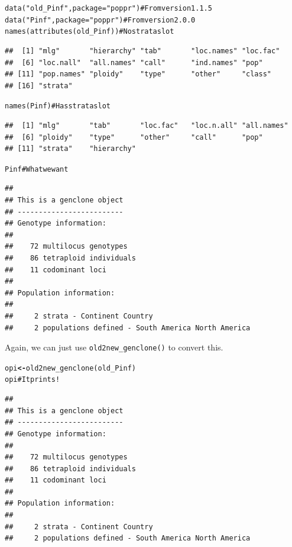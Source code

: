\documentclass[letterpaper]{article}\usepackage[]{graphicx}\usepackage[]{color}
\makeatletter
\newcommand{\hlstr}[1]{\textcolor[rgb]{0.651,0.522,0}{#1}}%
\newcommand{\hlcom}[1]{\textcolor[rgb]{1,0.502,0}{#1}}%
\newcommand{\hlstd}[1]{\textcolor[rgb]{0,0,0}{#1}}%
\newcommand{\hlkwb}[1]{\textcolor[rgb]{0.502,0.502,0.753}{\textbf{#1}}}%
\newcommand{\hlkwc}[1]{\textcolor[rgb]{0,0.502,0.753}{#1}}%
\newcommand{\hlkwd}[1]{\textcolor[rgb]{0,0.267,0.4}{#1}}%
\newenvironment{kframe}{%
 \def\at@end@of@kframe{}%
 \ifinner\ifhmode%
  \def\at@end@of@kframe{\end{minipage}}%
  \begin{minipage}{\columnwidth}%
 \fi\fi%
 \def\FrameCommand##1{\hskip\@totalleftmargin \hskip-\fboxsep
 \colorbox{shadecolor}{##1}\hskip-\fboxsep
     \hskip-\linewidth \hskip-\@totalleftmargin \hskip\columnwidth}%
 \MakeFramed {\advance\hsize-\width
   \@totalleftmargin\z@ \linewidth\hsize
   \@setminipage}}%
 {\par\unskip\endMakeFramed%
 \at@end@of@kframe}
\newenvironment{knitrout}{}{} %
\makeatother
\begin{document}
\begin{knitrout}
\color{fgcolor}\begin{kframe}
\begin{alltt}
\hlkwd{data}\hlstd{(}\hlstr{"old_Pinf"}\hlstd{,} \hlkwc{package} \hlstd{=} \hlstr{"poppr"}\hlstd{)} \hlcom{# From version 1.1.5}
\hlkwd{data}\hlstd{(}\hlstr{"Pinf"}\hlstd{,} \hlkwc{package} \hlstd{=} \hlstr{"poppr"}\hlstd{)}     \hlcom{# From version 2.0.0}
\hlkwd{names}\hlstd{(}\hlkwd{attributes}\hlstd{(old_Pinf))}         \hlcom{# No strata slot}
\end{alltt}
\begin{verbatim}
##  [1] "mlg"       "hierarchy" "tab"       "loc.names" "loc.fac"  
##  [6] "loc.nall"  "all.names" "call"      "ind.names" "pop"      
## [11] "pop.names" "ploidy"    "type"      "other"     "class"    
## [16] "strata"
\end{verbatim}
\begin{alltt}
\hlkwd{names}\hlstd{(Pinf)}                         \hlcom{# Has strata slot}
\end{alltt}
\begin{verbatim}
##  [1] "mlg"       "tab"       "loc.fac"   "loc.n.all" "all.names"
##  [6] "ploidy"    "type"      "other"     "call"      "pop"      
## [11] "strata"    "hierarchy"
\end{verbatim}
\begin{alltt}
\hlstd{Pinf}                                \hlcom{# What we want}
\end{alltt}
\begin{verbatim}
## 
## This is a genclone object
## -------------------------
## Genotype information:
## 
##    72 multilocus genotypes
##    86 tetraploid individuals
##    11 codominant loci
## 
## Population information:
## 
##     2 strata - Continent Country
##     2 populations defined - South America North America
\end{verbatim}
\end{kframe}
\end{knitrout}

Again, we can just use \texttt{old2new\_genclone()} to convert this. 

\begin{knitrout}
\color{fgcolor}\begin{kframe}
\begin{alltt}
\hlstd{opi} \hlkwb{<-} \hlkwd{old2new_genclone}\hlstd{(old_Pinf)}
\hlstd{opi} \hlcom{# It prints!}
\end{alltt}
\begin{verbatim}
## 
## This is a genclone object
## -------------------------
## Genotype information:
## 
##    72 multilocus genotypes
##    86 tetraploid individuals
##    11 codominant loci
## 
## Population information:
## 
##     2 strata - Continent Country
##     2 populations defined - South America North America
\end{verbatim}
\end{kframe}
\end{knitrout}
\end{document}
